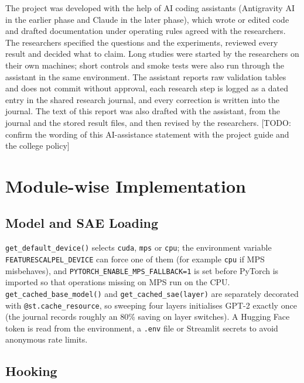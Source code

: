 \documentclass[12pt,a4paper]{report}
\newcommand{\todo}[1]{{\color{red}[TODO: #1]}}
\begin{document}
The project was developed with the help of AI coding assistants (Antigravity AI in the earlier phase and Claude in the later phase), which wrote or edited code and drafted documentation under operating rules agreed with the researchers. The researchers specified the questions and the experiments, reviewed every result and decided what to claim. Long studies were started by the researchers on their own machines; short controls and smoke tests were also run through the assistant in the same environment. The assistant reports raw validation tables and does not commit without approval, each research step is logged as a dated entry in the shared research journal, and every correction is written into the journal. The text of this report was also drafted with the assistant, from the journal and the stored result files, and then revised by the researchers. \todo{confirm the wording of this AI-assistance statement with the project guide and the college policy}

\section{Module-wise Implementation}

\subsection{Model and SAE Loading}

\texttt{get\_\allowbreak{}default\_\allowbreak{}device()} selects \texttt{cuda}, \texttt{mps} or \texttt{cpu}; the environment variable \texttt{FEATURESCALPEL\_\allowbreak{}DEVICE} can force one of them (for example \texttt{cpu} if MPS misbehaves), and \texttt{PYTORCH\_\allowbreak{}ENABLE\_\allowbreak{}MPS\_\allowbreak{}FALLBACK=1} is set before PyTorch is imported so that operations missing on MPS run on the CPU. \texttt{get\_\allowbreak{}cached\_\allowbreak{}base\_\allowbreak{}model()} and \texttt{get\_\allowbreak{}cached\_\allowbreak{}sae(layer)} are separately decorated with \texttt{@st.\allowbreak{}cache\_\allowbreak{}resource}, so sweeping four layers initialises GPT-2 exactly once (the journal records roughly an 80\% saving on layer switches). A Hugging Face token is read from the environment, a \texttt{.\allowbreak{}env} file or Streamlit secrets to avoid anonymous rate limits.

\subsection{Hooking}
\end{document}
